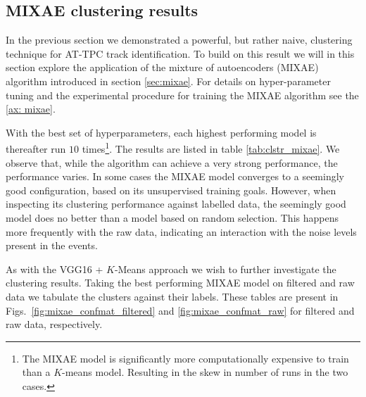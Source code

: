 \documentclass[review,sort&compress]{elsarticle}
\begin{document}
\subsection{MIXAE clustering results}

In the previous section we demonstrated a powerful, but rather naive, clustering technique for AT-TPC track identification. To build on this result we will in this section explore the application of the mixture of autoencoders (MIXAE) algorithm introduced in section \ref{sec:mixae}.
For details on hyper-parameter tuning and the experimental procedure for training the MIXAE algorithm see the \ref{ax: mixae}. 

With the best set of hyperparameters, each highest performing model is thereafter run $10$ times\footnote{The MIXAE model is significantly more computationally expensive to train than a $K$-means model. Resulting in the skew in number of runs in the two cases.}. The results are listed in table \ref{tab:clstr_mixae}.
We observe that, while the algorithm can achieve a very strong performance, the performance varies. In some cases the MIXAE model converges to a seemingly good configuration, based on its unsupervised training goals. However, when inspecting its clustering performance against labelled data, the seemingly good model does no better than a model based on random selection. 
This happens more frequently with the raw data, indicating an interaction with the noise levels present in the events. 
 
\begin{table}[H]
\centering 
\caption[MIXAE clustering performance]{MIXAE clustering performance on the ${}^{46} Ar$ experimental data with $N=10$ runs of the algorithm. To quantify the results we report the best performing model (Top 1), and the mean and standard deviation for the result ($\mu\pm \sigma$). In contrast with the VGG-16 + $K$-means approach we observe  significant variations in performance.}\label{tab:clstr_mixae}

\end{table}

As with the VGG16 + $K$-Means approach we wish to further investigate the clustering results. Taking the best performing MIXAE model on filtered and raw data we tabulate the clusters against their labels. These tables are present in Figs.~\ref{fig:mixae_confmat_filtered} and \ref{fig:mixae_confmat_raw} for filtered and raw data, respectively.
\end{document}

